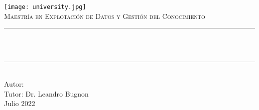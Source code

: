 \begin{titlepage}

    \newcommand{\HRule}{\rule{\linewidth}{0.5mm}}

    \center
    \texttt{[image: university.jpg]}\\[1cm]

    \textsc{\Large Maestr\'ia en Explotaci\'on de Datos y Gesti\'on del Conocimiento}\\[1.5cm]

    \makeatletter
    \HRule \\[0.6cm]
    {\huge \bfseries \@title}\\[0.4cm]
    \HRule \\[2cm]

    {\Large Autor: \@author}\\[1cm]
    {\Large Tutor: Dr. Leandro Bugnon}\\[3cm]

    {\large Julio 2022}\\[2cm]

    \vfill
\end{titlepage}